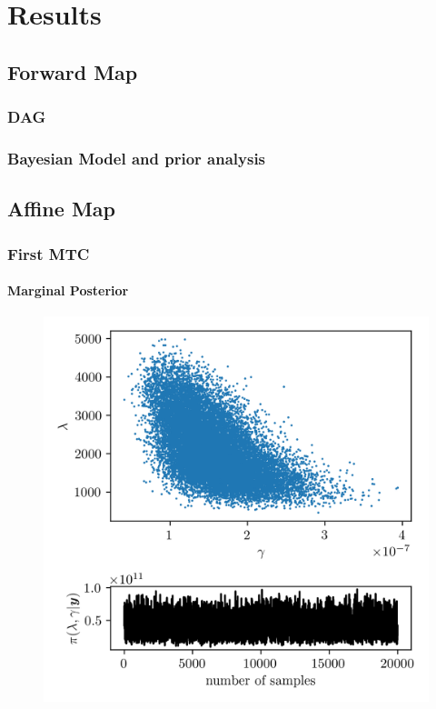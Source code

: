 \chapter{Results}
\section{Forward Map}
\subsection{DAG}

\subsection{Bayesian Model and prior analysis}

\section{Affine Map}
\subsection{First MTC}
\subsubsection{Marginal Posterior}

\begin{figure}[ht!]
	\centering
	\includegraphics{ScatterplusHisto.png}
	\caption[]{}
	\label{fig:}
\end{figure}

